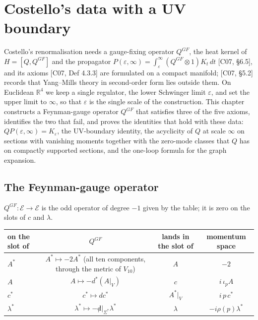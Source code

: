 \chapter{Costello's data with a UV boundary}

Costello's renormalisation needs a gauge-fixing operator $Q^{GF}$, the heat kernel of $H=[Q,Q^{GF}]$ and the propagator $P(\varepsilon,\infty)=\int_\varepsilon^\infty(Q^{GF}\otimes1)K_t\,dt$ [C07, §6.5], and its axioms [C07, Def 4.3.3] are formulated on a compact manifold; [C07, §5.2] records that Yang--Mills theory in second-order form lies outside them. On Euclidean $\mathbb R^4$ we keep a single regulator, the lower Schwinger limit $\varepsilon$, and set the upper limit to $\infty$, so that $\varepsilon$ is the single scale of the construction. This chapter constructs a Feynman-gauge operator $Q^{GF}$ that satisfies three of the five axioms, identifies the two that fail, and proves the identities that hold with these data: $QP(\varepsilon,\infty)=K_\varepsilon$, the UV-boundary identity, the acyclicity of $Q$ at scale $\infty$ on sections with vanishing moments together with the zero-mode classes that $Q$ has on compactly supported sections, and the one-loop formula for the graph expansion.

\section{The Feynman-gauge operator}

\begin{definition}
\label{def:c3-qgf}
$Q^{GF}\colon\mathscr E\to\mathscr E$ is the odd operator of degree $-1$ given by the table; it is zero on the slots of $c$ and $\lambda$.

\begin{tabular}{l|c|c|c}
on the slot of & $Q^{GF}$ & lands in the slot of & momentum space \\
\hline
$A^*$ & $A^*\mapsto-2A^*$ (all ten components, through the metric of $V_{10}$) & $A$ & $-2$ \\
$A$ & $A\mapsto-d^*(A|_V)$ & $c$ & $i\,\iota_pA$ \\
$c^*$ & $c^*\mapsto dc^*$ & $A^*|_V$ & $i\,p\,c^*$ \\
$\lambda^*$ & $\lambda^*\mapsto-{\not d}|_{\Sigma^*}\lambda^*$ & $\lambda$ & $-i\rho(p)\lambda^*$ \\
\end{tabular}
\end{definition}

